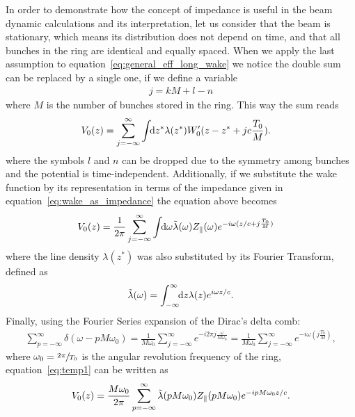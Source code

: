     In order to demonstrate how the concept of impedance is useful in the beam dynamic calculations and its interpretation, let us consider that the beam is stationary, which means its distribution does not depend on time, and that all bunches in the ring are identical and equally spaced. When we apply the last assumption to equation~\eqref{eq:general_eff_long_wake} we notice the double sum can be replaced by a single one, if we define a variable
    \begin{align*}
    	  j = kM + l - n
    \end{align*}
    where $M$ is the number of bunches stored in the ring. This way the sum reads
    \begin{align}
	  	V_0(z) = \sum_{j=-\infty}^\infty\int\!\!\text{d}z^* 
				&\lambda(z^*)W'_0(z-z^* + jc\frac{T_0}{M}).
    \end{align}
    where the symbols $l$ and $n$ can be dropped due to the symmetry among bunches and the potential is time-independent. Additionally, if we substitute the wake function by its representation in terms of the impedance given in equation~\eqref{eq:wake_as_impedance} the equation above becomes
    \begin{align}\label{eq:temp1}
	   	V_0(z) = \frac{1}{2\pi}\sum_{j=-\infty}^\infty\int\!\!\text{d}\omega 
 				&\tilde{\lambda}(\omega)Z_\parallel(\omega)e^{-i\omega(z/c + j\frac{T_0}{M})}
    \end{align}
    where the line density $\lambda(z^*)$ was also substituted by its Fourier  Transform, defined as
    \begin{align}
  		\tilde{\lambda}(\omega) = \int_{-\infty}^{\infty}\!\!\text{d}z \lambda(z)e^{i\omega z/c}.
    \end{align}
    Finally, using the Fourier Series expansion of the Dirac's delta comb:
    \begin{align}
  	  	\sum_{p=-\infty}^\infty \delta(\omega-pM\omega_0) =
	    	\frac{1}{M\omega_0} \sum_{j=-\infty}^\infty e^{-i2\pi j\frac{\omega}{M\omega_0}} =
	    	\frac{1}{M\omega_0} \sum_{j=-\infty}^\infty e^{-i\omega(j\frac{T_0}{M})},
    \end{align}
    where $\omega_0 = \sfrac{2\pi}{T_0}$ is the angular revolution frequency of the ring, equation~\eqref{eq:temp1} can be written as
    \begin{align}\label{eq:impedance_interpretation_long}
	  	V_0(z) = \frac{M\omega_0}{2\pi} \sum_{p=-\infty}^\infty \tilde{\lambda}(pM\omega_0)Z_\parallel(pM\omega_0)e^{-ipM\omega_0 z/c}.
    \end{align}
